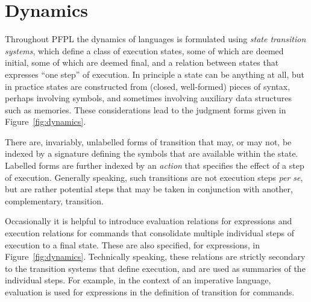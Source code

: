 \documentclass[11pt]{article}
\begin{document}
\section*{Dynamics}

Throughout \textsf{PFPL} the dynamics of languages is formulated using \emph{state transition systems}, which define a class of execution states, some of which are deemed initial, some of which are deemed final, and a relation between states that expresses ``one step'' of execution.  In principle a state can be anything at all, but in practice states are constructed from (closed, well-formed) pieces of syntax, perhaps involving symbols, and sometimes involving auxiliary data structures such as memories.  These considerations lead to the judgment forms given in Figure~\ref{fig:dynamics}.

There are, invariably, unlabelled forms of transition that may, or may not, be indexed by a signature defining the symbols that are available within the state.  Labelled forms are further indexed by an \emph{action} that specifies the effect of a step of execution.  Generally speaking, such transitions are not execution steps \textit{per se}, but are rather potential steps that may be taken in conjunction with another, complementary, transition.

\smallskip

Occasionally it is helpful to introduce evaluation relations for expressions and execution relations for commands that consolidate multiple individual steps of execution to a final state.  These are also specified, for expressions, in Figure~\ref{fig:dynamics}.  Technically speaking, these relations are strictly secondary to the transition systems that define execution, and are used as summaries of the individual steps.  For example, in the context of an imperative language, evaluation is used for expressions in the definition of transition for commands.
\end{document}
